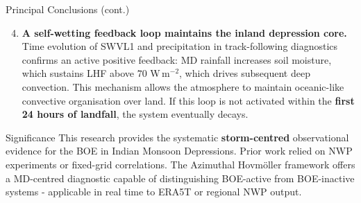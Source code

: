 \documentclass[aspectratio=169,t,xcolor=table]{beamer}
\begin{document}
\begin{frame}{Principal Conclusions (cont.)}
  \footnotesize
  \begin{enumerate}
      \setcounter{enumi}{3}
    \item \textbf{A self-wetting feedback loop maintains the inland
      depression core.}
      Time evolution of SWVL1 and precipitation in track-following diagnostics confirms an active positive feedback:
      MD rainfall increases soil moisture, which sustains LHF above $70$
      W\,m$^{-2}$, which drives subsequent deep convection. This
      mechanism allows the atmosphere to maintain oceanic-like convective
      organisation over land. If this loop is not activated within the
      \textbf{first 24 hours of landfall}, the system eventually decays.
  \end{enumerate}

  \vfill

  \begin{block}{\small Significance}
    \footnotesize
    This research provides the systematic \textbf{storm-centred} observational evidence for the BOE in Indian Monsoon Depressions. Prior work relied on NWP experiments or fixed-grid correlations. The Azimuthal Hovmöller framework offers a
    MD-centred diagnostic capable of distinguishing BOE-active from BOE-inactive systems - applicable in real time to ERA5T or regional NWP output.
  \end{block}
\end{frame}
\end{document}
